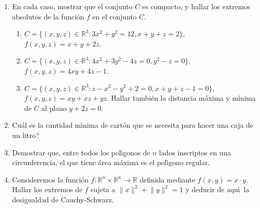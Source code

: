 \documentclass[11pt]{article}
\newcommand{\be}{\begin{enumerate}}
\newcommand{\ee}{\end{enumerate}}
\newcommand{\R}{\mathbb{R}}
\begin{document}
\begin{enumerate}
\item En cada caso, mostrar que el conjunto $C$ es compacto, y hallar los extremos absolutos de la funci\'on $f$ en el conjunto $C$.
\be
\item $C= \{(x,y,z)\in \R^3:3x^2+y^2=12, x+y+z=2\}$, $f(x,y,z)=x+y+2z$.
\item $C= \{(x,y,z)\in \R^3: 4x^2+3y^2-4z=0,y^2-z=0\}$, $f(x,y,z)=4xy+4z-1$.

\item $C=\{(x,y,z)\in \R^3:z-x^2-y^2+2=0, x+y+z-1=0\}$, $f(x,y,z)=xy+xz+yz$. Hallar tambi\'en la distancia m\'axima y m\'inima de $C$ al plano $y+2z=0$.
 
\ee

\item Cu\'al es la cantidad m\'\i nima de cart\'on que se necesita
  para hacer una caja de un litro?
   
\item Demostrar que, entre todos los pol\'\i gonos de $n$ lados
  inscriptos en una circunferencia, el que tiene \'area m\'axima es el
  pol\'\i gono regular. 
  
\item Consideremos la funci\'on $f:\R^n \times \R^n \to \R$ definida
  mediante $f(x,y) = x\cdot y$. Hallar los
  extremos de $f$  sujeta a $\lVert x\rVert^2 + \lVert y \rVert
  ^2 =1$ y deducir de aqu\'\i\ la desigualdad de Cauchy-Schwarz.    

\end{enumerate}
\end{document}
